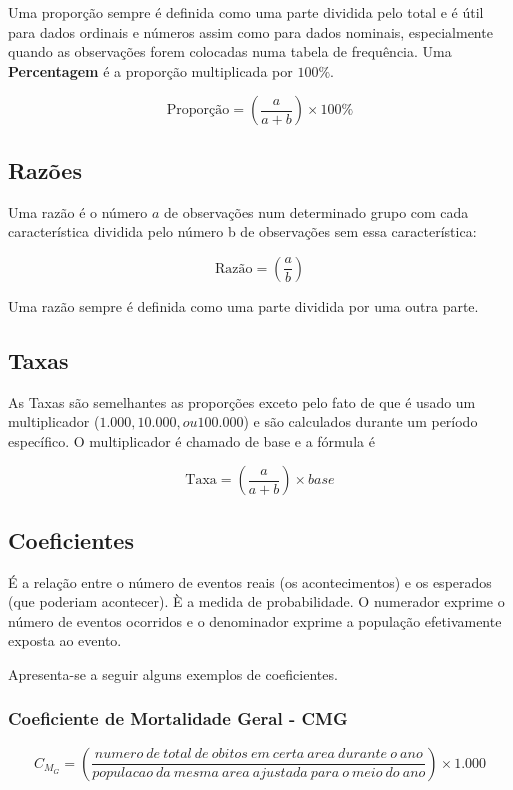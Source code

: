 Uma proporção sempre é definida como uma parte dividida pelo total e é útil para dados ordinais e números assim como para dados nominais, especialmente quando as observações forem colocadas numa tabela de frequência. Uma \textbf{Percentagem} é a proporção multiplicada por $100\%$.\vskip0.3cm


$$ \mbox{Proporção} = \left( \frac{a}{a+b} \right) \times 100\% $$


\subsection{Razões}

Uma razão é o número $a$ de observações num determinado grupo com cada característica
dividida pelo número b de observações sem essa característica:


$$ 
\mbox{Razão} = \left( \frac{a}{b} \right)
$$

Uma razão sempre é definida como uma parte dividida por uma outra parte.\vskip0.3cm

\subsection{Taxas}

As Taxas são semelhantes as proporções exceto pelo fato de que é usado um multiplicador ($1.000 , 10.000 , ou 100.000$) e são calculados durante um período específico. O multiplicador é chamado de base e a fórmula é


$$ 
\mbox{Taxa} = \left( \frac{a}{a+b} \right) \times base
$$



\subsection{Coeficientes}

É a relação entre o número de eventos reais (os acontecimentos) e os esperados (que poderiam acontecer). È a medida de probabilidade. O numerador exprime o número de eventos ocorridos e o denominador exprime a população efetivamente exposta ao evento.\vskip0.3cm

Apresenta-se a seguir alguns exemplos de coeficientes.

\subsubsection{Coeficiente de Mortalidade Geral - CMG}

$$
C_{M_{G}} = \left(  \frac{numero \ de \ total \ de \ obitos \ em \ certa \ area \ durante \ o \ ano}{populacao \ da \ mesma \ area \ ajustada \ para \ o \ meio \ do \ ano} \right) \times 1.000
$$

